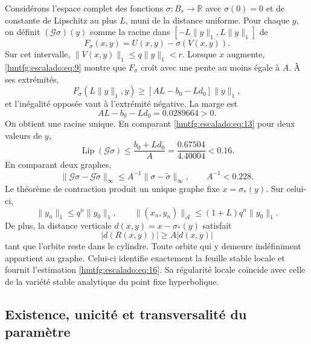 Considérons l’espace complet des fonctions \(\sigma:B_r\to\mathbb R\) avec \(\sigma(0)=0\) et de constante de Lipschitz au plus \(L\), muni de la distance uniforme. Pour chaque \(y\), on définit \((\mathcal G\sigma)(y)\) comme la racine dans \([-L\|y\|_1,L\|y\|_1]\) de
\begin{equation}
F_\sigma(x,y)=U(x,y)-\sigma(V(x,y)).
\label{hmtfg:escalado:eq:13}
\end{equation}
Sur cet intervalle, \(\|V(x,y)\|_1\le q\|y\|_1<r\). Lorsque \(x\) augmente, \eqref{hmtfg:escalado:eq:9} montre que \(F_\sigma\) croît avec une pente au moins égale à \(A\). À ses extrémités,
\[
F_\sigma(L\|y\|_1,y)
\ge[AL-b_0-Ld_0]\|y\|_1,
\]
et l’inégalité opposée vaut à l’extrémité négative. La marge est
\begin{equation}
AL-b_0-Ld_0=0.0289664>0.
\label{hmtfg:escalado:eq:14}
\end{equation}
On obtient une racine unique. En comparant \eqref{hmtfg:escalado:eq:13} pour deux valeurs de \(y\),
\[
\operatorname{Lip}(\mathcal G\sigma)
\le\frac{b_0+Ld_0}{A}
=\frac{0.67504}{4.40004}<0.16.
\]
En comparant deux graphes,
\begin{equation}
\|\mathcal G\sigma-\mathcal G\widetilde\sigma\|_\infty
\le A^{-1}\|\sigma-\widetilde\sigma\|_\infty,
\qquad A^{-1}<0.228.
\label{hmtfg:escalado:eq:15}
\end{equation}
Le théorème de contraction produit un unique graphe fixe \(x=\sigma_*(y)\). Sur celui-ci,
\begin{equation}
\|y_n\|_1\le q^n\|y_0\|_1,
\qquad
\|(x_n,y_n)\|_{\mathcal A}\le(1+L)q^n\|y_0\|_1.
\label{hmtfg:escalado:eq:16}
\end{equation}
De plus, la distance verticale \(d(x,y)=x-\sigma_*(y)\) satisfait
\[
|d(R(x,y))|\ge A|d(x,y)|
\]
tant que l’orbite reste dans le cylindre. Toute orbite qui y demeure indéfiniment appartient au graphe. Celui-ci identifie exactement la feuille stable locale et fournit l’estimation \eqref{hmtfg:escalado:eq:16}. Sa régularité locale coïncide avec celle de la variété stable analytique du point fixe hyperbolique.


\subsection{Existence, unicité et transversalité du paramètre}
\label{hmtfg:escalado:6}

